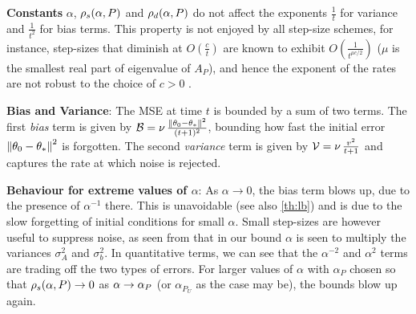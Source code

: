 \textbf{Constants} {$\alpha$, $\rho_s(\alpha,P)$ and $\rho_d(\alpha,P)$} do not affect the exponents $\frac{1}{t}$ for variance and $\frac{1}{t^2}$ for bias terms. This property is not enjoyed by all step-size schemes, for instance, step-sizes that diminish at $O(\frac{c}{t})$ are known to exhibit $O(\frac{1}{t^{\mu c/2}})$ ($\mu$ is the smallest real part of eigenvalue of $A_P$), and hence the exponent of the rates are not robust to the choice of $c>0$ \cite{bach-moulines,korda-prashanth}.

\textbf{Bias and Variance}: The MSE at time $t$ is bounded by a sum of two terms. The first \emph{bias} term is given by $\mathcal{B}=\nu \,\frac{\left\| \theta_0-\theta_*\right\|^2}{(t+1)^2}$, bounding how fast the initial error $\left\| \theta_0-\theta_*\right\|^2$ is forgotten. 
The second \emph{variance} term is  given by $\mathcal{V}=\nu\, \frac{v^2}{t+1} $ and captures the rate at which noise is rejected.

\textbf{Behaviour for extreme values of $\alpha$}: 
As $\alpha\to 0$, the bias term blows up, due to the presence of $\alpha^{-1}$ there. This is unavoidable (see also \cref{th:lb}) and is due to the slow forgetting of initial conditions for small $\alpha$. Small step-sizes are however useful to suppress noise, as seen from that in our bound $\alpha$ is seen to multiply the variances $\sigma^2_A$ and $\sigma^2_b$. In quantitative terms, we can see that the $\alpha^{-2}$ and $\alpha^2$ terms are trading off the two types of errors. 
For larger values of $\alpha$ with $\alpha_P$ chosen so that $\rho_s(\alpha,P)\rightarrow 0$ as $\alpha\rightarrow \alpha_{P}$  (or $\alpha_{P_U}$ as the case may be), the bounds blow up again.

